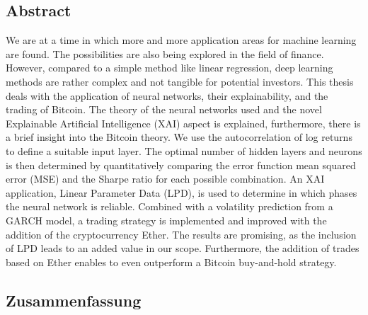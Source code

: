 \documentclass[
]{article}
\author{}
\date{\vspace{-2.5em}}
\begin{document}




\setcounter{tocdepth}{4}
\tableofcontents

\newpage

\hypertarget{abstract}{%
\subsection{Abstract}\label{abstract}}

We are at a time in which more and more application areas for machine
learning are found. The possibilities are also being explored in the
field of finance. However, compared to a simple method like linear
regression, deep learning methods are rather complex and not tangible
for potential investors. This thesis deals with the application of
neural networks, their explainability, and the trading of Bitcoin. The
theory of the neural networks used and the novel Explainable Artificial
Intelligence (XAI) aspect is explained, furthermore, there is a brief
insight into the Bitcoin theory. We use the autocorrelation of log
returns to define a suitable input layer. The optimal number of hidden
layers and neurons is then determined by quantitatively comparing the
error function mean squared error (MSE) and the Sharpe ratio for each
possible combination. An XAI application, Linear Parameter Data (LPD),
is used to determine in which phases the neural network is reliable.
Combined with a volatility prediction from a GARCH model, a trading
strategy is implemented and improved with the addition of the
cryptocurrency Ether. The results are promising, as the inclusion of LPD
leads to an added value in our scope. Furthermore, the addition of
trades based on Ether enables to even outperform a Bitcoin buy-and-hold
strategy.

\newpage

\hypertarget{zusammenfassung}{%
\subsection{Zusammenfassung}\label{zusammenfassung}}
\end{document}
